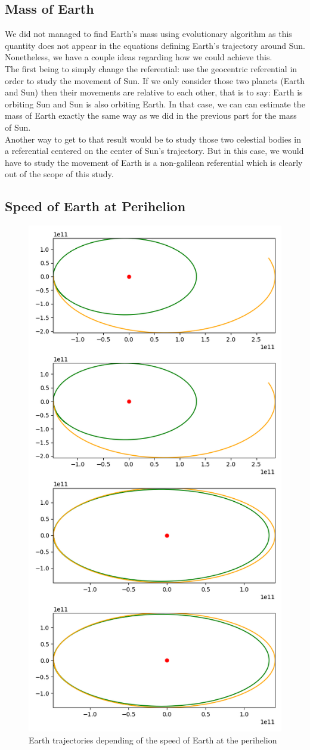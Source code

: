 \subsection{Mass of Earth}
We did not managed to find Earth's mass using evolutionary algorithm as this quantity does not appear in the equations defining Earth's trajectory around Sun. Nonetheless, we have a couple ideas regarding how we could achieve this.\\
The first being to simply change the referential: use the geocentric referential in order to study the movement of Sun. If we only consider those two planets (Earth and Sun) then their movements are relative to each other, that is to say: Earth is orbiting Sun and Sun is also orbiting Earth. In that case, we can can estimate the mass of Earth exactly the same way as we did in the previous part for the mass of Sun.\\
Another way to get to that result would be to study those two celestial bodies in a referential centered on the center of Sun's trajectory. But in this case, we would have to study the movement of Earth is a non-galilean referential which is clearly out of the scope of this study.

\subsection{Speed of Earth at Perihelion}
\begin{figure}
    \center
    \includegraphics[width=0.5\linewidth,scale=.3]{img/earth_speed.png}
    \caption{Earth trajectories depending of the speed of Earth at the perihelion}
\end{figure}

